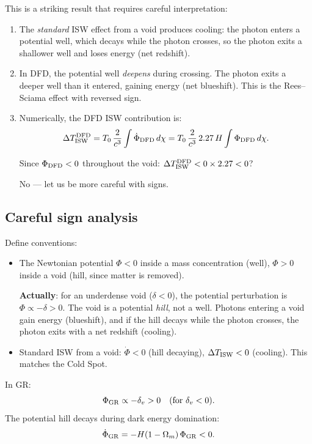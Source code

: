 \documentclass[11pt,a4paper]{article}
\newcommand{\Omm}{\Omega_m}
\begin{document}
This is a striking result that requires careful interpretation:

\begin{enumerate}
\item The \emph{standard} ISW effect from a void produces cooling:
the photon enters a potential well, which decays while the photon
crosses, so the photon exits a shallower well and loses energy (net
redshift).

\item In DFD, the potential well \emph{deepens} during crossing.
The photon exits a deeper well than it entered, gaining energy (net
blueshift). This is the Rees--Sciama effect with reversed sign.

\item Numerically, the DFD ISW contribution is:
\begin{equation}
\Delta T_{\rm ISW}^{\rm DFD}
= T_0\,\frac{2}{c^3}\int \dot{\Phi}_{\rm DFD}\,d\chi
= T_0\,\frac{2}{c^3}\,2.27\,H\int \Phi_{\rm DFD}\,d\chi.
\end{equation}

Since $\Phi_{\rm DFD} < 0$ throughout the void:
$\Delta T_{\rm ISW}^{\rm DFD} < 0 \times 2.27 < 0$?

No --- let us be more careful with signs.
\end{enumerate}

\subsection{Careful sign analysis}
\label{sec:signs}

Define conventions:
\begin{itemize}[nosep]
\item The Newtonian potential $\Phi < 0$ inside a mass concentration
  (well), $\Phi > 0$ inside a void (hill, since matter is removed).

  \textbf{Actually}: for an underdense void ($\delta < 0$), the
  potential perturbation is $\Phi \propto -\delta > 0$. The void
  is a potential \emph{hill}, not a well. Photons entering a void
  gain energy (blueshift), and if the hill decays while the photon
  crosses, the photon exits with a net redshift (cooling).
\item Standard ISW from a void: $\dot{\Phi} < 0$ (hill decaying),
  $\Delta T_{\rm ISW} < 0$ (cooling). This matches the Cold Spot.
\end{itemize}

In GR:
\begin{equation}
\Phi_{\rm GR} \propto -\delta_v > 0 \quad (\text{for } \delta_v < 0).
\end{equation}
The potential hill decays during dark energy domination:
\begin{equation}
\dot{\Phi}_{\rm GR} = -H(1-\Omm)\,\Phi_{\rm GR} < 0.
\end{equation}
\end{document}

